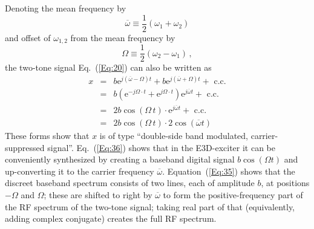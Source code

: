 \documentclass[11pt,oneside,a4paper]{scrartcl}
\newcommand{\Equation}[1]{Equation~(\ref{Eq:#1})}
\newcommand{\Eq}[1]{Eq.~(\ref{Eq:#1})}
\newcommand{\ave}[1]{\ensuremath{\overline{#1}}}
\newcommand{ \Exp }[1] {\ensuremath {\mathrm e ^ {#1}}}
\begin{document}
Denoting the mean frequency by
\[
	\overline{\omega} \equiv \frac 1 2 (\omega_1 + \omega_2)
\]
and offset of $\omega_{1,2}$ from the mean frequency by
\[
	\Omega \equiv \frac 1 2 (\omega_2 - \omega_1)	\,,
\]
the two-tone signal \Eq{20} can also be written as
\begin{eqnarray}
	x 	&=& 	b \Exp{j(\ave{\omega}-\Omega)t} 
					+ b \Exp{j(\ave{\omega}+\Omega) t} 
						+ \mbox{ c.c.} \nonumber \\
		&=& 	b (\Exp{-j\Omega \cdot t} 
					+ \Exp{j\Omega \cdot t})
						\Exp{j \ave{\omega} t} 
					 		+ \mbox{ c.c.}	
								\label{Eq:35} \\
		&=& 	2b \cos(\Omega \, t) \cdot
					 	\Exp{j \ave{\omega} t}
					 	+ \mbox{ c.c.}	
								\label{Eq:36} \\
		&=& 	2b \cos(\Omega \, t) \cdot
					 	2\cos(\ave{\omega} t)
								\label{Eq:37}
\end{eqnarray}
%
These forms show that $x$ is of type ``double-side band modulated, carrier-suppressed signal''. \Eq{36} shows that in the E3D-exciter it can be conveniently synthesized by creating a baseband digital signal 
$b \cos(\Omega t)$
and up-converting it to the carrier frequency 
$\ave \omega$. \Equation{35} shows that the discreet baseband spectrum consists of two lines, each of amplitude $b$, at positions $-\Omega$ and $\Omega$; these are shifted to right by $\ave{\omega}$ to form the positive-frequency part of the RF spectrum of the two-tone signal; taking real part of that (equivalently, adding complex conjugate) creates the full RF spectrum.  
\end{document}
